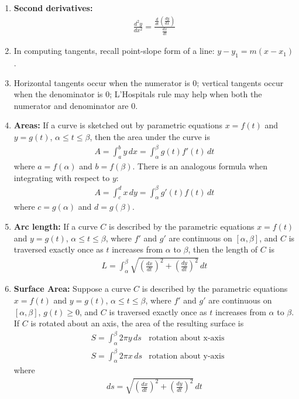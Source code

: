 \documentclass[10pt]{article}
\begin{document}
\begin{multicols}{2}
\begin{enumerate}
\begin{enumerate}
        \item \textbf{Second derivatives:} 
        \begin{align*}
            \frac{d^2y}{dx^2} = \frac{\frac{d}{dt}(\frac{dy}{dx})}{\frac{dx}{dt}}
        \end{align*}
        \item In computing tangents, recall point-slope form of a line: $y - y_1 = m(x - x_1)$.  
        \item Horizontal tangents occur when the numerator is 0; vertical tangents occur when the denominator is 0; L'Hospitals rule may help when both the numerator and denominator are 0.
        
        \item \textbf{Areas:} If a curve is sketched out by parametric equations $x = f(t)$ and $y = g(t)$, $\alpha \leq t \leq \beta$, then the area under the curve is 
        \begin{align*}
            A = \int_a^b y \, dx = \int_\alpha^\beta g(t) f'(t) \, dt
        \end{align*}
        where $a = f(\alpha)$ and $b = f(\beta)$. There is an analogous formula when integrating with respect to $y$:
        \begin{align*}
            A = \int_c^d x \, dy = \int_\alpha^\beta g'(t) f(t) \, dt
        \end{align*}
        where $c = g(\alpha)$ and $d = g(\beta)$.
        \item \textbf{Arc length:} If a curve $C$ is described by the parametric equations $x = f(t)$ and $y = g(t)$, $\alpha \leq t \leq \beta$, where $f'$ and $g'$ are continuous on $[\alpha, \beta]$, and $C$ is traversed exactly once as $t$ increases from $\alpha$ to $\beta$, then the length of $C$ is 
        \begin{align*}
            L = \int_\alpha^\beta \sqrt{ \left(\frac{dx}{dt}\right)^2 + \left(\frac{dy}{dt}\right)^2} \, dt
        \end{align*}
        \item \textbf{Surface Area:} Suppose a curve $C$ is described by the parametric equations $x = f(t)$ and $y = g(t)$, $\alpha \leq t \leq \beta$, where $f'$ and $g'$ are continuous on $[\alpha, \beta]$, $g(t) \geq 0$, and $C$ is traversed exactly once as $t$ increases from $\alpha$ to $\beta$. If $C$ is rotated about an axis, the area of the resulting surface is         \begin{align*}
            &S = \int_\alpha^\beta 2\pi y \, ds &\text{rotation about x-axis} \\
            &S = \int_\alpha^\beta 2\pi x \, ds &\text{rotation about y-axis}
        \end{align*}
        where
        \begin{align*}
            ds = \sqrt{ \left(\frac{dx}{dt}\right)^2 + \left(\frac{dy}{dt}\right)^2} \, dt
        \end{align*}
    \end{enumerate}
    

\end{enumerate}
\end{multicols}
\end{document}
